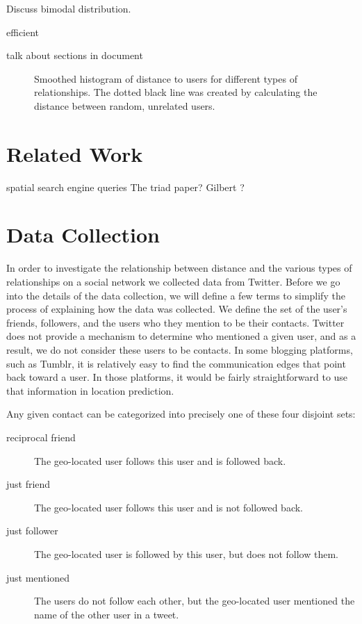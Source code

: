 \documentclass{sig-alternate}
\begin{document}
Discuss bimodal distribution.

efficient


talk about sections in document

\begin{figure}
\centering
{}
\caption{
Smoothed histogram of distance to users for different types of relationships.
The dotted black line was created by calculating the distance between random, unrelated users.
}
\label{fig:EdgeTypes}
\end{figure}


\section{Related Work}
\cite{scellato2011socio}
\cite{scellato2010distance}
\cite{backstrom2010find}
\cite{cheng2010you}
\cite{backstrom2008spatial} spatial search engine queries
\cite{gilbert2009predicting}
\cite{cranshaw2010bridging}
\cite{java2007we}
The triad paper?
Gilbert ?


\section{Data Collection}
In order to investigate the relationship between distance and the various types of relationships on a social network we collected data from Twitter.
Before we go into the details of the data collection, we will define a few terms to simplify the process of explaining how the data was collected.
We define the set of the user's friends, followers, and the users who they mention to be their contacts.
Twitter does not provide a mechanism to determine who mentioned a given user, and as a result, we do not consider these users to be contacts.
In some blogging platforms, such as Tumblr, it is relatively easy to find the communication edges that point back toward a user.
In those platforms, it would be fairly straightforward to use that information in location prediction.

Any given contact can be categorized into precisely one of these four disjoint sets:
\begin{description}
\item[reciprocal friend] The geo-located user follows this user and is followed back.
\item[just friend] The geo-located user follows this user and is not followed back.
\item[just follower]The geo-located user is followed by this user, but does not follow them.
\item[just mentioned] The users do not follow each other, but the geo-located user mentioned the name of the other user in a tweet.
\end{description}
\end{document}
